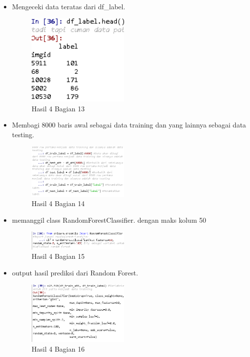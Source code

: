 \begin{itemize}
\item Mengeceki data teratas dari df\_label.

\begin{figure}[H]
\centerline{\includegraphics[width=5cm]{figures/1174089/3/praktek15.PNG}}
\caption{Hasil 4 Bagian 13}
\label{labelgambar}
\end{figure}

\item Membagi 8000 baris awal sebagai data training dan yang lainnya sebagai data testing.

\begin{figure}[H]
\centerline{\includegraphics[width=5cm]{figures/1174089/3/praktek16.PNG}}
\caption{Hasil 4 Bagian 14}
\label{labelgambar}
\end{figure}

\item memanggil class RandomForestClassifier. dengan maks kolum 50

\begin{figure}[H]
\centerline{\includegraphics[width=5cm]{figures/1174089/3/praktek17.PNG}}
\caption{Hasil 4 Bagian 15}
\label{labelgambar}
\end{figure}

\item output hasil prediksi dari Random Forest.

\begin{figure}[H]
\centerline{\includegraphics[width=5cm]{figures/1174089/3/praktek18.PNG}}
\caption{Hasil 4 Bagian 16}
\label{labelgambar}
\end{figure}


\end{itemize}
